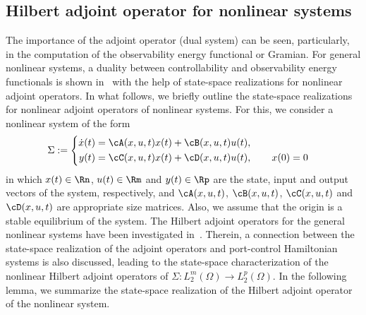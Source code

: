 \subsection{Hilbert adjoint operator for nonlinear systems}
 The importance of the adjoint operator (dual system) can be seen, particularly, in the computation of the observability energy functional or Gramian.
 For  general nonlinear systems, a duality between controllability and observability energy functionals is shown in~\cite{Adjfujimoto2002} with the help of  state-space realizations for nonlinear adjoint operators. In what follows, we briefly outline the state-space realizations for nonlinear adjoint operators of nonlinear systems. For this, we consider a nonlinear system of the form
 \begin{equation}\label{eq:Gen_Nonlinear}
\Sigma := \begin{cases}
\begin{aligned}
 \dot{x}(t) &= \cA(x,u,t) x(t) + \cB(x,u,t)u(t),\\
 y(t) &= \cC(x,u,t)x(t) + \cD(x,u,t)u(t),\qquad x(0) = 0
 \end{aligned}
\end{cases}
\end{equation}
in which $x(t) \in \Rn$, $u(t) \in \Rm$ and $y(t) \in \Rp$ are the state, input and output  vectors of the system, respectively, and $\cA(x,u,t)$, $\cB(x,u,t) $, $\cC(x,u,t)$ and $\cD(x,u,t) $ are appropriate size matrices.  Also, we assume that the origin is a stable equilibrium of the system. The Hilbert adjoint operators for the general nonlinear systems have been investigated in~\cite{Adjfujimoto2002}. Therein,  a connection between the state-space realization of the adjoint operators and  port-control Hamiltonian systems is also discussed, leading to the state-space characterization of the nonlinear Hilbert adjoint operators of $\Sigma:L_2^m(\Omega) \rightarrow L_2^p(\Omega)$. In the following lemma, we summarize the state-space realization of the Hilbert adjoint operator of the nonlinear system.
